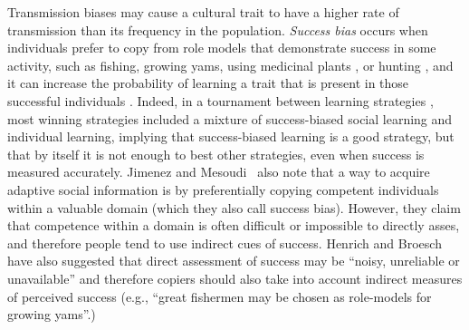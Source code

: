 \documentclass[12pt]{extarticle}
\begin{document}
Transmission biases may cause a cultural trait to have a higher rate of transmission than its frequency in the population.
\textit{Success bias} occurs when individuals prefer to copy from role models that demonstrate success in some activity, such as fishing, growing yams, using medicinal plants \citep{fijian_social_bias}, or hunting \citep{Mesoudi2008}, and it can increase the probability of learning a trait that is present in those successful individuals \citep{Borofsky2022}. 
Indeed, in a tournament between learning strategies  \citep{strategiesPaper}, most winning strategies included a mixture of success-biased social learning and individual learning, implying that success-biased learning is a good strategy, but that by itself it is not enough to best other strategies, even when success is measured accurately.
Jimenez and Mesoudi~\citep{prestigeSocialLearn} also note that a way to acquire adaptive social information is by preferentially copying competent individuals within a valuable domain (which they also call success bias). However, they claim that competence within a domain is often difficult or impossible to directly asses, and therefore people tend to use indirect cues of success.
Henrich and Broesch \citep{fijian_social_bias} have also suggested that direct assessment of success may be ``noisy, unreliable or unavailable'' and therefore copiers should also take into account indirect measures of perceived success (e.g., ``great fishermen may be chosen as role-models for growing yams''.) 
\end{document}
